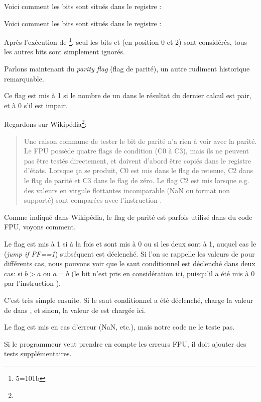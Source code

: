 Voici comment les bits \CThreeBits sont situés dans le registre \AX:



Voici comment les bits \CThreeBits sont situés dans le registre \AH:



Après l'exécution de \footnote{5=101b}, seul les bits \Czero et \Ctwo
(en position 0 et 2) sont considérés, tous les autres bits sont simplement ignorés.

\label{parity_flag}

Parlons maintenant du \emph{parity flag} (flag de parité), un autre rudiment historique
remarquable.

Ce flag est mis à 1 si le nombre de un dans le résultat du dernier calcul est pair,
et à 0 s'il est impair.

Regardons sur Wikipédia\footnote{\WikipediaParityFlag}:

\begin{framed}
\begin{quotation}
Une raison commune de tester le bit de parité n'a rien à voir avec la parité. Le FPU
possède quatre flags de condition (C0 à C3), mais ils ne peuvent pas être testés
directement, et doivent d'abord être copiés dans le registre d'états.
Lorsque ça se produit, C0 est mis dans le flag de retenue, C2 dans le flag
de parité et C3 dans le flag de zéro.
Le flag C2 est mis lorsque e.g. des valeurs en virgule flottantes incomparable
(NaN ou format non supporté) sont comparées avec l'instruction \FUCOM.
\end{quotation}
\end{framed}

Comme indiqué dans Wikipédia, le flag de parité est parfois utilisé dans du code
FPU, voyons comment.


Le flag \PF est mis à 1 si à la fois \Czero et \Ctwo sont mis à 0 ou si les deux
sont à 1, auquel cas le \JP (\emph{jump if PF==1}) subséquent est déclenché.
Si l'on se rappelle les valeurs de \CThreeBits pour différents cas, nous pouvons
voir que le saut conditionnel \JP est déclenché dans deux cas: si $b>a$ ou $a=b$
(le bit \Cthree n'est pris en considération ici, puisqu'il a été mis à 0 par l'instruction
).

C'est très simple ensuite.
Si le saut conditionnel a été déclenché, \FLD charge la valeur de  dans
, et sinon, la valeur de  est chargée ici.


Le flag \Ctwo est mis en cas d'erreur (\gls{NaN}, etc.), mais notre code ne le teste
pas.

Si le programmeur veut prendre en compte les erreurs FPU, il doit ajouter des tests
supplémentaires.


